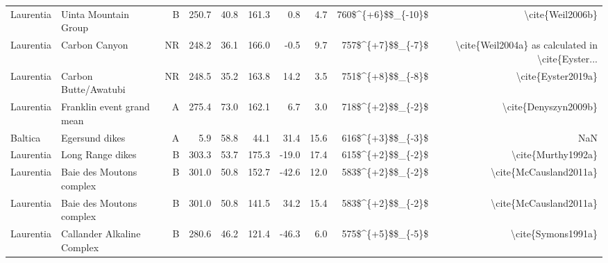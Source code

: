 \begin{longtable}{p{1 in}p{1 in}rrrrrrrr}
                     Laurentia &                               Uinta Mountain Group &      B &     250.7 &      40.8 & 161.3 &   0.8 &       4.7 &     760\$\textasciicircum \{+6\}\$\$\_\{-10\}\$ &                                   \textbackslash cite\{Weil2006b\} \\
                     Laurentia &                                      Carbon Canyon &     NR &     248.2 &      36.1 & 166.0 &  -0.5 &       9.7 &      757\$\textasciicircum \{+7\}\$\$\_\{-7\}\$ &  \textbackslash cite\{Weil2004a\} as calculated in \textbackslash cite\{Eyster... \\
                     Laurentia &                               Carbon Butte/Awatubi &     NR &     248.5 &      35.2 & 163.8 &  14.2 &       3.5 &      751\$\textasciicircum \{+8\}\$\$\_\{-8\}\$ &                                 \textbackslash cite\{Eyster2019a\} \\
                     Laurentia &                          Franklin event grand mean &      A &     275.4 &      73.0 & 162.1 &   6.7 &       3.0 &      718\$\textasciicircum \{+2\}\$\$\_\{-2\}\$ &                               \textbackslash cite\{Denyszyn2009b\} \\
                       Baltica &                                     Egersund dikes &      A &       5.9 &      58.8 &  44.1 &  31.4 &      15.6 &      616\$\textasciicircum \{+3\}\$\$\_\{-3\}\$ &                                                NaN \\
                     Laurentia &                                   Long Range dikes &      B &     303.3 &      53.7 & 175.3 & -19.0 &      17.4 &      615\$\textasciicircum \{+2\}\$\$\_\{-2\}\$ &                                 \textbackslash cite\{Murthy1992a\} \\
                     Laurentia &                           Baie des Moutons complex &      B &     301.0 &      50.8 & 152.7 & -42.6 &      12.0 &      583\$\textasciicircum \{+2\}\$\$\_\{-2\}\$ &                             \textbackslash cite\{McCausland2011a\} \\
                     Laurentia &                           Baie des Moutons complex &      B &     301.0 &      50.8 & 141.5 &  34.2 &      15.4 &      583\$\textasciicircum \{+2\}\$\$\_\{-2\}\$ &                             \textbackslash cite\{McCausland2011a\} \\
                     Laurentia &                         Callander Alkaline Complex &      B &     280.6 &      46.2 & 121.4 & -46.3 &       6.0 &      575\$\textasciicircum \{+5\}\$\$\_\{-5\}\$ &                                 \textbackslash cite\{Symons1991a\} \\

\end{longtable}
